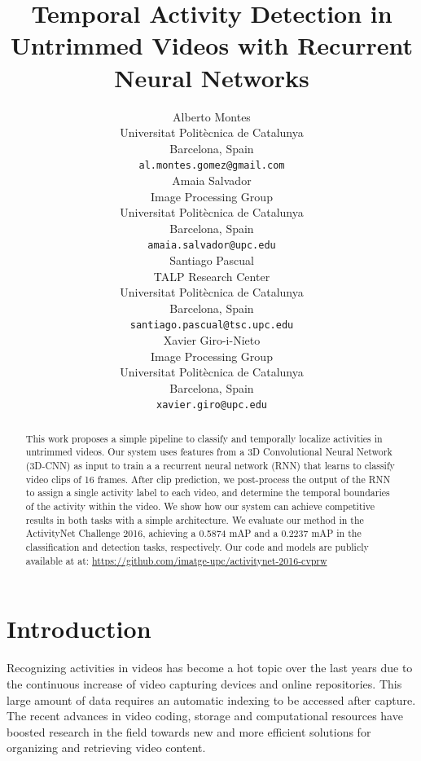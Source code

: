\documentclass{article}
\title{Temporal Activity Detection in Untrimmed Videos with Recurrent Neural Networks}
\author{
    Alberto Montes \\
    Universitat Politècnica de Catalunya \\
    Barcelona, Spain \\
    \texttt{al.montes.gomez@gmail.com} \\
    \And
    Amaia Salvador \\
    Image Processing Group \\
    Universitat Politècnica de Catalunya \\
    Barcelona, Spain \\
    \texttt{amaia.salvador@upc.edu} \\
    \And
    Santiago Pascual \\
    TALP Research Center \\
    Universitat Politècnica de Catalunya \\
    Barcelona, Spain \\
    \texttt{santiago.pascual@tsc.upc.edu} \\
    \And
    Xavier Giro-i-Nieto \\
    Image Processing Group \\
    Universitat Politècnica de Catalunya \\
    Barcelona, Spain \\
    \texttt{xavier.giro@upc.edu} \\
}
\begin{document}

\maketitle

\begin{abstract}


    This work proposes a simple pipeline to classify and temporally localize activities in untrimmed videos. Our system uses features from a 3D Convolutional Neural Network (3D-CNN) as input to train a a recurrent neural network (RNN) that learns to classify video clips of 16 frames. After clip prediction, we post-process the output of the RNN to assign a single activity label to each video, and determine the temporal boundaries of the activity within the video. We show how our system can achieve competitive results in both tasks with a simple architecture. We evaluate our method in the ActivityNet Challenge 2016, achieving a 0.5874 mAP and a 0.2237 mAP in the classification and detection tasks, respectively. Our code and models are publicly available at at: \url{https://github.com/imatge-upc/activitynet-2016-cvprw}

\end{abstract}

\section{Introduction}

Recognizing activities in videos has become a hot topic over the last years due to the continuous increase of video capturing devices and online repositories.
This large amount of data requires an automatic indexing to be accessed after capture.
The recent advances in video coding, storage and computational resources have boosted research in the field towards new and more efficient solutions for organizing and retrieving video content.
\end{document}
